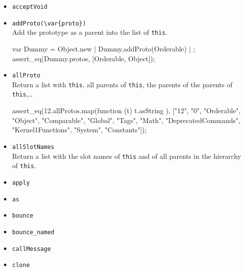 \begin{itemize}
\item \lstinline|acceptVoid|\\

\item \lstinline|addProto(\var{proto})|\\
  Add the prototype  as a parent into the list of
  \lstinline|this|.

\begin{urbiscript}
var Dummy = Object.new | Dummy.addProto(Orderable) | {};
assert_eq(Dummy.protos, [Orderable, Object]);
\end{urbiscript}

\item \lstinline|allProto|\\
  Return a list with \lstinline|this|, all parents of
  \lstinline|this|, the parents of the parents of
  \lstinline|this|,\ldots

\begin{urbiscript}[firstnumber=last]
assert_eq(12.allProtos.map(function (t) { t.asString }),
          ["12", "0", "Orderable", "Object", "Comparable", "Global",
           "Tags", "Math", "DeprecatedCommands", "Kernel1Functions",
           "System", "Constants"]);
\end{urbiscript}

\item \lstinline|allSlotNames|\\
  Return a list with the slot names of \lstinline|this| and of all
  parents in the hierarchy of \lstinline|this|.

\item \lstinline|apply|\\

\item \lstinline|as|\\

\item \lstinline|bounce|\\

\item \lstinline|bounce_named|\\

\item \lstinline|callMessage|\\

\item \lstinline|clone|\\


\end{itemize}
